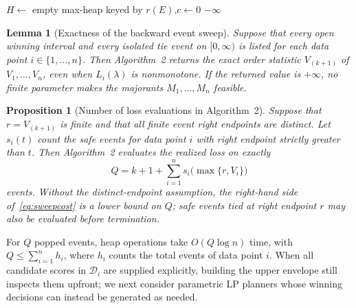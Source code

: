 \documentclass[a4paper,10pt]{article}
\theoremstyle{plain}
\newtheorem{lemma}[theorem]{Lemma}
\newtheorem{proposition}[theorem]{Proposition}
\theoremstyle{remark}
\begin{document}
\begingroup
\SetAlFnt{\small}
\begin{algorithm}[H]
\caption{Backward event sweep}\label{alg:sweep-code}
$H\gets$ empty max-heap keyed by $r(E)$,\quad $c\gets 0$\;
\Return $-\infty$\;
\end{algorithm}
\endgroup

\begin{lemma}[Exactness of the backward event sweep]\label{lem:sweep}
Suppose that every open winning interval and every isolated tie event on $[0,\infty)$ is listed for each data point $i\in\{1,\ldots,n\}$. Then Algorithm~2 returns the exact order statistic $V_{(k+1)}$ of $V_1,\ldots,V_n$, even when $L_i(\lambda)$ is nonmonotone. If the returned value is $+\infty$, no finite parameter makes the majorants $M_1,\ldots,M_n$ feasible.
\end{lemma}

\begin{proposition}[Number of loss evaluations in Algorithm~2]\label{prop:sweepcost}
Suppose that $r=V_{(k+1)}$ is finite and that all finite event right endpoints are distinct. Let $s_i(t)$ count the safe events for data point $i$ with right endpoint strictly greater than $t$. Then Algorithm~2 evaluates the realized loss on exactly
\begin{equation}\label{eq:sweepcost}
 Q=k+1+\sum_{i=1}^n s_i\bigl(\max\{r,V_i\}\bigr)
\end{equation}
events. Without the distinct-endpoint assumption, the right-hand side of~\eqref{eq:sweepcost} is a lower bound on $Q$; safe events tied at right endpoint $r$ may also be evaluated before termination.
\end{proposition}

For $Q$ popped events, heap operations take $O(Q\log n)$ time, with $Q\le\sum_{i=1}^n h_i$, where $h_i$ counts the total events of data point $i$. When all candidate scores in $\mathcal D_i$ are supplied explicitly, building the upper envelope still inspects them upfront; we next consider parametric LP planners whose winning decisions can instead be generated as needed.
\end{document}
